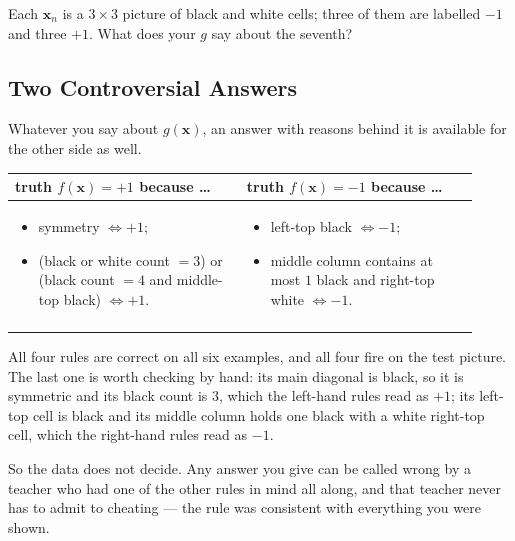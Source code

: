 Each \(\bm{x}_n\) is a \(3 \times 3\) picture of black and white cells; three of
them are labelled \(-1\) and three \(+1\). What does your \(g\) say about the
seventh?

\subsection{Two Controversial Answers}

Whatever you say about \(g(\bm{x})\), an answer with reasons behind it is
available for the other side as well.

\begin{center}
    \begin{tabular}{@{}p{0.46\linewidth}p{0.46\linewidth}@{}}
        \toprule
        \textbf{truth \(f(\bm{x}) = +1\) because \ldots} &
        \textbf{truth \(f(\bm{x}) = -1\) because \ldots}\\
        \midrule
        \begin{itemize}[leftmargin=*, nosep]
            \item symmetry \(\iff +1\);
            \item (black or white count \(= 3\)) or (black count \(= 4\) and
                middle-top black) \(\iff +1\).
        \end{itemize}
        &
        \begin{itemize}[leftmargin=*, nosep]
            \item left-top black \(\iff -1\);
            \item middle column contains at most \(1\) black and right-top white
                \(\iff -1\).
        \end{itemize}\\
        \addlinespace[4pt]
        \bottomrule
    \end{tabular}
\end{center}

\begin{observation}
    All four rules are correct on all six examples, and all four fire on the
    test picture. The last one is worth checking by hand: its main diagonal is
    black, so it is symmetric and its black count is \(3\), which the left-hand
    rules read as \(+1\); its left-top cell is black and its middle column holds
    one black with a white right-top cell, which the right-hand rules read as
    \(-1\).
\end{observation}

So the data does not decide. Any answer you give can be called wrong by a
teacher who had one of the other rules in mind all along, and that teacher never
has to admit to cheating --- the rule was consistent with everything you were
shown.

